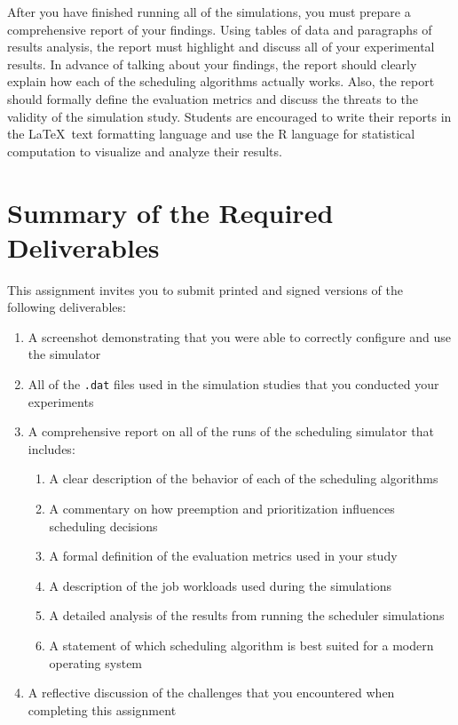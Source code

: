   After you have finished running all of the simulations, you must prepare a comprehensive report of your findings.
  Using tables of data and paragraphs of results analysis, the report must highlight and discuss all of your
  experimental results. In advance of talking about your findings, the report should clearly explain how each of the
  scheduling algorithms actually works. Also, the report should formally define the evaluation metrics and discuss the
  threats to the validity of the simulation study. Students are encouraged to write their reports in the
  \LaTeX~text formatting language and use the R language for statistical computation to visualize and analyze their results.

\section*{Summary of the Required Deliverables}

This assignment invites you to submit printed and signed versions of the following deliverables: 

\begin{enumerate}

  \itemsep0in

  \item A screenshot demonstrating that you were able to correctly configure and use the simulator

  \item All of the {\tt .dat} files used in the simulation studies that you conducted your experiments

  \item A comprehensive report on all of the runs of the scheduling simulator that includes:

  \begin{enumerate}

  \itemsep0in
    \item A clear description of the behavior of each of the scheduling algorithms
    \item A commentary on how preemption and prioritization influences scheduling decisions
    \item A formal definition of the evaluation metrics used in your study
    \item A description of the job workloads used during the simulations
    \item A detailed analysis of the results from running the scheduler simulations
    \item A statement of which scheduling algorithm is best suited for a modern operating system

  \end{enumerate}

  \item A reflective discussion of the challenges that you encountered when completing this assignment

\end{enumerate}

